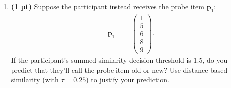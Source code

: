 \documentclass[11pt]{article}
\begin{document}
\begin{enumerate}
\begin{enumerate}
\item \textbf{(1 pt)}  Suppose the participant instead receives the probe item
  $\mathbf{p}_1$:
\begin{eqnarray*}
\mathbf{p}_1&=&
\left( 
\begin{array}{c}
1\\
5\\
6\\
8\\
9
\end{array} 
\right).
\end{eqnarray*}
If the participant's summed similarity decision threshold is 1.5, do you predict
that they'll call the probe item old or new?  Use distance-based
similarity (with $\tau = 0.25$) to justify your prediction.


\end{enumerate}


\end{enumerate}
\end{document}
